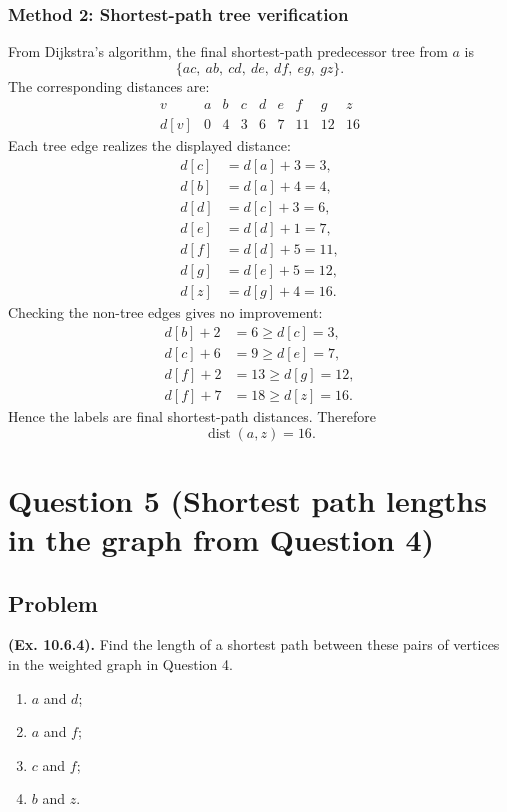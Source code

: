 \documentclass[12pt]{article}
\DeclareMathOperator{\dist}{dist}
\begin{document}
\subsubsection{Method 2: Shortest-path tree verification}
From Dijkstra's algorithm, the final shortest-path predecessor tree from $a$ is
\[
  \{a c,\ a b,\ c d,\ d e,\ d f,\ e g,\ g z\}.
\]
The corresponding distances are:
\[
\begin{array}{c|cccccccc}
v & a&b&c&d&e&f&g&z\\ \hline
d[v] & 0&4&3&6&7&11&12&16
\end{array}
\]
Each tree edge realizes the displayed distance:
\[
\begin{aligned}
d[c]&=d[a]+3=3,\\
d[b]&=d[a]+4=4,\\
d[d]&=d[c]+3=6,\\
d[e]&=d[d]+1=7,\\
d[f]&=d[d]+5=11,\\
d[g]&=d[e]+5=12,\\
d[z]&=d[g]+4=16.
\end{aligned}
\]
Checking the non-tree edges gives no improvement:
\[
\begin{aligned}
d[b]+2&=6\ge d[c]=3,\\
d[c]+6&=9\ge d[e]=7,\\
d[f]+2&=13\ge d[g]=12,\\
d[f]+7&=18\ge d[z]=16.
\end{aligned}
\]
Hence the labels are final shortest-path distances. Therefore
\[
  \boxed{\dist(a,z)=16.}
\]

\newpage
\section{Question 5 (Shortest path lengths in the graph from Question 4)}

\subsection{Problem}
\textbf{(Ex. 10.6.4).} Find the length of a shortest path between these pairs of vertices in the weighted graph in Question 4.
\begin{enumerate}[label=(\alph*)]
  \item $a$ and $d$;
  \item $a$ and $f$;
  \item $c$ and $f$;
  \item $b$ and $z$.
\end{enumerate}
\end{document}
